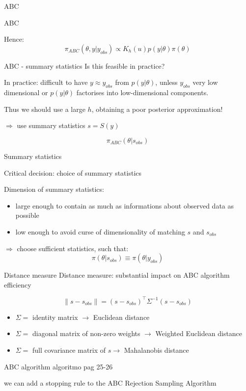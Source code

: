 \documentclass{beamer}
\theoremstyle{plain}
\begin{document}
\begin{section}{ABC}
\begin{frame}{ABC}
	
	\vspace{0.2cm}
	Hence:
	\[\pi_{ABC}(\theta, y | y_{obs}) \propto K_h(u)p(y|\theta)\pi(\theta)\]
	
	
\end{frame}

\begin{frame}{ABC - summary statistics}
	Is this feasible in practice?
	
	\vspace{0.5cm}
	In practice: difficult to have $y\approx y_{obs}$ from $p(y|\theta)$, unless $y_{obs}$ very low dimensional or $p(y|\theta)$ factorises into low-dimensional components.
	
	Thus we should use a large $h$, obtaining a poor posterior approximation!
	
	$\Longrightarrow$ use summary statistics $s = S(y)$
	
	\[  \pi_{ABC} (\theta | s_{obs})   \]
\end{frame}

\begin{frame}{Summary statistics}

	Critical decision: choice of summary statistics
	
	\vspace{0.3cm}
	Dimension of summary statistics:
	\begin{itemize}
		\item large enough to contain as much as informations about observed data as possible
		\item low enough to avoid curse of dimensionality of matching $s$ and $s_{obs}$
	\end{itemize}

	\vspace{0.3cm}
	$\Longrightarrow$ choose sufficient statistics, such that:
	\[   \pi(\theta|s_{obs}) \equiv \pi(\theta|y_{obs})   \]

\end{frame}

\begin{frame}{Distance measure}
	Distance measure: substantial impact on ABC algorithm efficiency
	
	\[  \parallel s - s_{obs} \parallel = (s - s_{obs})^\top \Sigma^{-1} (s - s_{obs}) \]
	
	\begin{itemize}
		\item $\Sigma = $ identity matrix $ \rightarrow$ Euclidean distance 
		\item $\Sigma =$ diagonal matrix of non-zero weights $ \rightarrow$ Weighted Euclidean distance 
		\item $\Sigma = $ full covariance matrix of $s \rightarrow$ Mahalanobis distance 
	\end{itemize}
\end{frame}

\begin{frame}{ABC algorithm}
	algoritmo pag 25-26
	
	we can add a stopping rule to the ABC Rejection Sampling Algorithm
\end{frame}
	
\end{section}
\end{document}
